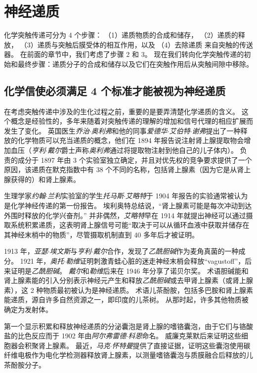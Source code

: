 \chapter{神经递质} \label{chap:chap16}

化学突触传递可分为 4 个步骤：
（1）递质物质的合成和储存，
（2）递质的释放，
（3）递质与突触后膜受体的相互作用，以及
（4）去除递质 来自突触的传送器。
在前面的章节中，我们考虑了步骤 2 和 3。
现在我们转向化学突触传递的初始和最终步骤：递质分子的合成和储存以及它们在突触作用后从突触间隙中移除。



\section{化学信使必须满足 4 个标准才能被视为神经递质}

在考虑突触传递中涉及的生化过程之前，重要的是要弄清楚化学递质的含义。
这个概念是经验性的，多年来随着对突触传递的理解的增加和信号代理的相应扩展而发生了变化。
英国医生\textit{乔治$\cdot$奥利弗}和他的同事\textit{爱德华$\cdot$艾伯特$\cdot$谢弗}提出了一种释放的化学物质可以充当递质的概念，他们在 1894 年报告说注射肾上腺提取物会增加血压（\textit{亨利$\cdot$戴尔}爵士声称\textit{奥利弗}通过将提取物注射到他自己的儿子体内）。
负责的成分于 1897 年由 3 个实验室独立确定，并且对优先权的竞争要求提供了一个原因，该递质在默克指数中有 38 个不同的名称，包括肾上腺素（因为它是从肾上腺获得的）和肾上腺素。


生理学家\textit{约翰$\cdot$兰利}实验室的学生\textit{托马斯$\cdot$艾略特}于 1904 年报告的实验通常被认为是化学神经传递的第一份报告。
埃利奥特总结说，“肾上腺素可能是每次冲动到达外围时释放的化学兴奋剂。” 
并非偶然，\textit{艾略特}早在 1914 年就提出神经可以通过摄取系统积累递质，这表明肾上腺信号可能“取决于可以从循环血液中获取并储存在其神经末梢中的物质”，尽管摄取机制直到 40 多年后才被证明。


1913 年，\textit{亚瑟$\cdot$埃文斯}与\textit{亨利$\cdot$戴尔}合作，发现了\textit{乙酰胆碱}作为麦角真菌的一种成分。
1921 年，\textit{奥托$\cdot$勒维}证明刺激青蛙心脏的迷走神经末梢会释放“vagustoff”，后来证明是\textit{乙酰胆碱}。
\textit{戴尔}和\textit{勒维}后来在 1946 年分享了诺贝尔奖。
术语胆碱能和肾上腺素能的引入分别表示神经元产生和释放\textit{乙酰胆碱}或去甲肾上腺素（或肾上腺素），这 2 种物质最初被认为是神经递质。
术语儿茶酚胺，包括多巴胺和肾上腺素能递质，源自许多自然资源之一，即印度的儿茶树。
从那时起，许多其他物质被确定为发射体。


第一个显示积累和释放神经递质的分泌囊泡是肾上腺的嗜铬囊泡，由于它们与铬酸盐的比色反应而于 1902 年由\textit{阿尔弗雷德$\cdot$科恩}命名。
威廉克莱默后来证明这些细胞器会积聚肾上腺素。
最近，\textit{马克$\cdot$怀特曼}提供了直接证据，证明这些囊泡使用碳纤维电极作为电化学检测器释放肾上腺素，以测量嗜铬囊泡与质膜融合后释放的儿茶酚胺分子。


